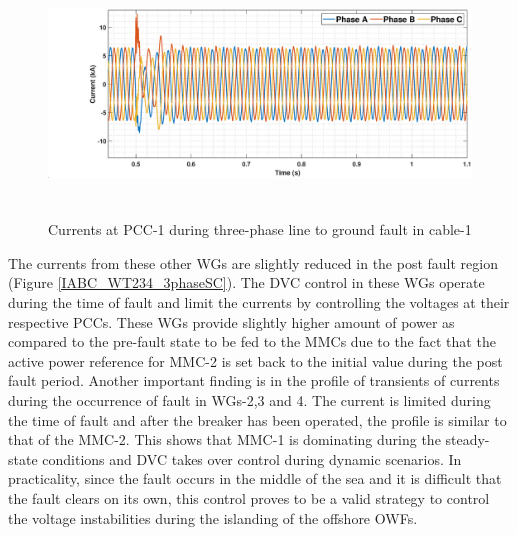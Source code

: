 \begin{figure}[H]
\centering
    \includegraphics[height = 6.5cm,width = 17.25cm]{Diagrams/Chapter_5/IABC_WT1_3phaseSC.eps}
    \caption{Currents at PCC-1 during three-phase line to ground fault in cable-1}
    \label{WT1_currents_3phasefault}
\end{figure}


The currents from these other \gls{WG}s are slightly reduced in the post fault region (Figure \ref{IABC_WT234_3phaseSC}). The \gls{DVC} control in these \gls{WG}s operate during the time of fault and limit the currents by controlling the voltages at their respective \gls{PCC}s. These \gls{WG}s provide slightly higher amount of power as compared to the pre-fault state to be fed to the \gls{MMC}s due to the fact that the active power reference for \gls{MMC}-2 is set back to the initial value during the post fault period. Another important finding is in the profile of transients of currents during the occurrence of fault in \gls{WG}s-2,3 and 4. The current is limited during the time of fault and after the breaker has been operated, the profile is similar to that of the \gls{MMC}-2. This shows that \gls{MMC}-1 is dominating during the steady-state conditions and \gls{DVC} takes over control during dynamic scenarios. In practicality, since the fault occurs in the middle of the sea and it is difficult that the fault clears on its own, this control proves to be a valid strategy to control the voltage instabilities during the islanding of the offshore \gls{OWF}s. 

